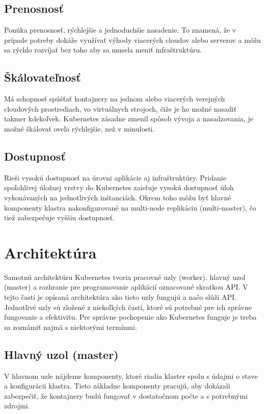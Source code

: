 \subsection*{Prenosnosť}
Ponúka prenosnosť, rýchlejšie a jednoduchšie nasadenie. To znamená, že v prípade potreby dokáže využívať výhody viacerých cloudov alebo serverov a môžu sa rýchlo rozvíjať bez toho aby sa musela meniť infraštruktúru.

\subsection*{Škálovateľnosť}
Má schopnosť spúšťať kontajnery na jednom alebo viacerých verejných cloudových prostrediach, vo virtuálnych strojoch, čiže je ho možné nasadiť takmer kdekoľvek. Kubernetes zásadne zmenil spôsob vývoja a nasadzovania, je možné škálovať oveľa rýchlejšie, než v minulosti.

\subsection*{Dostupnosť}
Rieši vysokú dostupnosť na úrovni aplikácie aj infraštruktúry. Pridanie spoľahlivej úložnej vrstvy do Kubernetes zaisťuje vysokú dostupnosť úloh vykonávaných na jednotlivých inštanciách. Okrem toho môžu byť hlavné komponenty klastra nakonfigurované na multi-node replikáciu (multi-master), čo tiež zabezpečuje vyššiu dostupnosť.

\section{Architektúra}
Samotnú architektúru Kubernetes tvoria pracovné uzly (worker), hlavný uzol (master) a rozhranie pre programovanie aplikácií oznacované skratkou API. V tejto časti je opísaná architektúra ako tieto uzly fungujú a načo slúži API. Jednotlivé uzly sú zložené z niekoľkých častí, ktoré sú potrebné pre ich správne fungovanie a efektivitu. Pre správne pochopenie ako Kubernetes funguje je treba sa zoznámiť najmä s niektorými termínmi.

\subsection{Hlavný uzol (master)}

V hlavnom uzle nájdeme komponenty, ktoré riadia klaster spolu s údajmi o stave a konfigurácii klastra. Tieto základne komponenty pracujú, aby dokázali zabezpečiť, že kontajnery budú fungovať v dostatočnom počte a s potrebnými zdrojmi.

